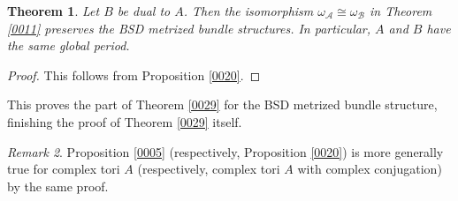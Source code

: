 \documentclass{amsart}
\newtheorem{theorem}{Theorem}[section]
\theoremstyle{remark}
\newtheorem{remark}[theorem]{Remark}
\numberwithin{equation}{section}
\begin{document}
\begin{theorem} \label{0031}
	Let $B$ be dual to $A$.
	Then the isomorphism
	$\omega_{\mathcal{A}} \cong \omega_{\mathcal{B}}$
	in Theorem \ref{0011}
	preserves the BSD metrized bundle structures.
	In particular, $A$ and $B$ have the same global period.
\end{theorem}

\begin{proof}
	This follows from Proposition \ref{0020}.
\end{proof}

This proves the part of Theorem \ref{0029}
for the BSD metrized bundle structure,
finishing the proof of Theorem \ref{0029} itself.

\begin{remark}
	Proposition \ref{0005}
	(respectively, Proposition \ref{0020})
	is more generally true for complex tori $A$
	(respectively, complex tori $A$ with complex conjugation)
	by the same proof.
\end{remark}

\end{document}
